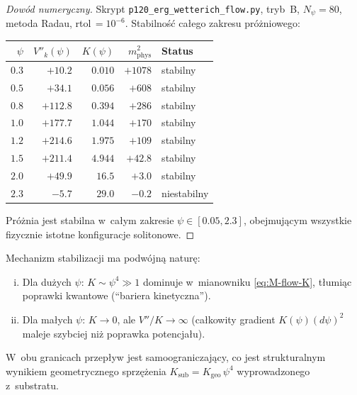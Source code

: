 \begin{proof}[Dow\'od numeryczny]
Skrypt \texttt{p120\_erg\_wetterich\_flow.py}, tryb~B,
$N_\psi = 80$, metoda Radau, rtol\,$= 10^{-6}$.
Stabilno\'s\'c ca\l{}ego zakresu pr\'o\.zniowego:

\medskip
\begin{center}
\begin{tabular}{@{}rrrrl@{}}
\toprule
$\psi$ & $V''_k(\psi)$ & $K(\psi)$ & $m^2_{\mathrm{phys}}$ & Status \\
\midrule
$0.3$ & $+10.2$  & $0.010$ & $+1078$ & stabilny \\
$0.5$ & $+34.1$  & $0.056$ & $+608$  & stabilny \\
$0.8$ & $+112.8$ & $0.394$ & $+286$  & stabilny \\
$1.0$ & $+177.7$ & $1.044$ & $+170$  & stabilny \\
$1.2$ & $+214.6$ & $1.975$ & $+109$  & stabilny \\
$1.5$ & $+211.4$ & $4.944$ & $+42.8$ & stabilny \\
$2.0$ & $+49.9$  & $16.5$  & $+3.0$  & stabilny \\
$2.3$ & $-5.7$   & $29.0$  & $-0.2$  & niestabilny \\
\bottomrule
\end{tabular}
\end{center}

Pr\'o\.znia jest stabilna w~ca\l{}ym zakresie $\psi \in [0.05, 2.3]$,
obejmuj\k{a}cym wszystkie fizycznie istotne konfiguracje solitonowe.
\end{proof}

\begin{remark}%
\label{rem:M-mechanism}
Mechanizm stabilizacji ma podw\'ojn\k{a} natur\k{e}:
\begin{enumerate}[(i)]
\item Dla du\.zych $\psi$: $K \sim \psi^4 \gg 1$
      dominuje w~mianowniku \eqref{eq:M-flow-K},
      t\l{}umi\k{a}c poprawki kwantowe
      (``bariera kinetyczna'').
\item Dla ma\l{}ych $\psi$: $K \to 0$, ale $V''/K \to \infty$
      (ca\l{}kowity gradient $K(\psi)(d\psi)^2$ maleje szybciej
      ni\.z poprawka potencja\l{}u).
\end{enumerate}
W~obu granicach przep\l{}yw jest samoograniczaj\k{a}cy,
co jest strukturalnym wynikiem geometrycznego sprz\k{e}\.zenia
$K_{\mathrm{sub}} = K_{\mathrm{geo}}\,\psi^4$
wyprowadzonego z~substratu.
\end{remark}


